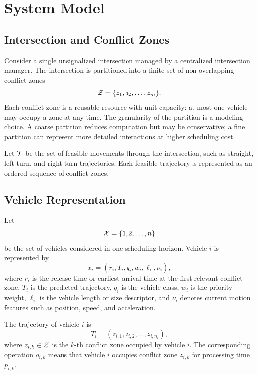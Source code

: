 \section{System Model}

\subsection{Intersection and Conflict Zones}

Consider a single unsignalized intersection managed by a centralized intersection manager. The intersection is partitioned into a finite set of non-overlapping conflict zones
\begin{equation}
    \mathcal{Z} = \{z_1,z_2,\ldots,z_m\}.
\end{equation}
Each conflict zone is a reusable resource with unit capacity: at most one vehicle may occupy a zone at any time. The granularity of the partition is a modeling choice. A coarse partition reduces computation but may be conservative; a fine partition can represent more detailed interactions at higher scheduling cost.

Let $\mathcal{T}$ be the set of feasible movements through the intersection, such as straight, left-turn, and right-turn trajectories. Each feasible trajectory is represented as an ordered sequence of conflict zones.

\subsection{Vehicle Representation}

Let
\begin{equation}
    \mathcal{X} = \{1,2,\ldots,n\}
\end{equation}
be the set of vehicles considered in one scheduling horizon. Vehicle $i$ is represented by
\begin{equation}
    x_i = (r_i, T_i, q_i, w_i, \ell_i, \nu_i),
\end{equation}
where $r_i$ is the release time or earliest arrival time at the first relevant conflict zone, $T_i$ is the predicted trajectory, $q_i$ is the vehicle class, $w_i$ is the priority weight, $\ell_i$ is the vehicle length or size descriptor, and $\nu_i$ denotes current motion features such as position, speed, and acceleration.

The trajectory of vehicle $i$ is
\begin{equation}
    T_i = (z_{i,1},z_{i,2},\ldots,z_{i,n_i}),
\end{equation}
where $z_{i,k}\in \mathcal{Z}$ is the $k$-th conflict zone occupied by vehicle $i$. The corresponding operation $o_{i,k}$ means that vehicle $i$ occupies conflict zone $z_{i,k}$ for processing time $p_{i,k}$.

